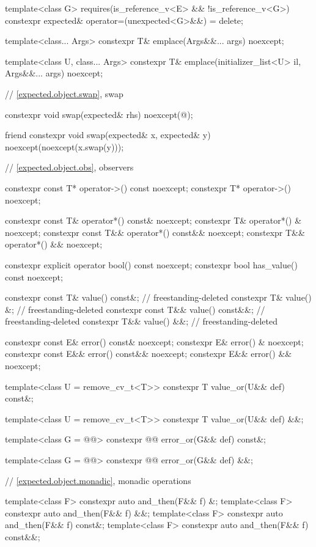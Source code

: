 \begin{codeblock}
{{    template<class G>
      requires(is_reference_v<E> && !is_reference_v<G>)
    constexpr expected& operator=(unexpected<G>&&) = delete;

    template<class... Args> constexpr T& emplace(Args&&... args) noexcept;

    template<class U, class... Args>
    constexpr T& emplace(initializer_list<U> il, Args&&... args) noexcept;

    // \ref{expected.object.swap}, swap

    constexpr void swap(expected& rhs) noexcept(@\seebelow@);

    friend constexpr void swap(expected& x, expected& y) noexcept(noexcept(x.swap(y)));

    // \ref{expected.object.obs}, observers

    constexpr const T* operator->() const noexcept;
    constexpr T* operator->() noexcept;

    constexpr const T& operator*() const& noexcept;
    constexpr T& operator*() & noexcept;
    constexpr const T&& operator*() const&& noexcept;
    constexpr T&& operator*() && noexcept;

    constexpr explicit operator bool() const noexcept;
    constexpr bool has_value() const noexcept;

    constexpr const T& value() const&;   // freestanding-deleted
    constexpr T& value() &;              // freestanding-deleted
    constexpr const T&& value() const&&; // freestanding-deleted
    constexpr T&& value() &&;            // freestanding-deleted

    constexpr const E& error() const& noexcept;
    constexpr E& error() & noexcept;
    constexpr const E&& error() const&& noexcept;
    constexpr E&& error() && noexcept;

    template<class U = remove_cv_t<T>> constexpr T value_or(U&& def) const&;

    template<class U = remove_cv_t<T>> constexpr T value_or(U&& def) &&;

    template<class G = @@>
    constexpr @@ error_or(G&& def) const&;

    template<class G = @@>
    constexpr @@ error_or(G&& def) &&;

    // \ref{expected.object.monadic}, monadic operations

    template<class F> constexpr auto and_then(F&& f) &;
    template<class F> constexpr auto and_then(F&& f) &&;
    template<class F> constexpr auto and_then(F&& f) const&;
    template<class F> constexpr auto and_then(F&& f) const&&;

}}
\end{codeblock}
